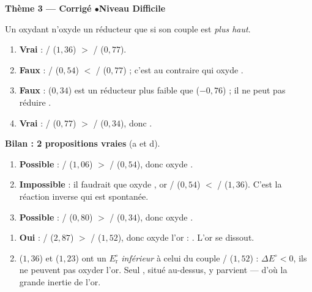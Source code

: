 \documentclass[11pt,a4paper]{article}
\begin{document}
\begin{center}\color{primarydark}\large\bfseries Thème 3 — Corrigé \quad$\bullet$\quad Niveau Difficile\end{center}

\begin{corrige}
Un oxydant n'oxyde un réducteur que si son couple est \emph{plus haut}.
\begin{enumerate}[label=\alph*)]
  \item \textbf{Vrai} : / ($1{,}36$) $>$ / ($0{,}77$).
  \item \textbf{Faux} : / ($0{,}54$) $<$ / ($0{,}77$) ; c'est au
        contraire  qui oxyde .
  \item \textbf{Faux} :  ($0{,}34$) est un réducteur plus faible que  ($-0{,}76$) ; il ne
        peut pas réduire .
  \item \textbf{Vrai} : / ($0{,}77$) $>$ / ($0{,}34$), donc
        .
\end{enumerate}
\textbf{Bilan : 2 propositions vraies} (a et d).
\end{corrige}

\begin{corrige}
\begin{enumerate}[label=\alph*)]
  \item \textbf{Possible} : / ($1{,}06$) $>$ / ($0{,}54$), donc 
        oxyde .
  \item \textbf{Impossible} : il faudrait que  oxyde , or / ($0{,}54$)
        $<$ / ($1{,}36$). C'est la réaction inverse qui est spontanée.
  \item \textbf{Possible} : / ($0{,}80$) $>$ / ($0{,}34$), donc
         oxyde .
\end{enumerate}
\end{corrige}

\begin{corrige}
\begin{enumerate}[label=\alph*)]
  \item \textbf{Oui} : / ($2{,}87$) $>$ / ($1{,}52$), donc 
        oxyde l'or : . L'or se dissout.
  \item {} ($1{,}36$) et  ($1{,}23$) ont un $E_{\mathrm{r}}^{\circ}$ \emph{inférieur} à
        celui du couple / ($1{,}52$) : $\Delta E^{\circ}<0$, ils ne peuvent pas
        oxyder l'or. Seul , situé au-dessus, y parvient — d'où la grande inertie de l'or.
\end{enumerate}
\end{corrige}
\end{document}
